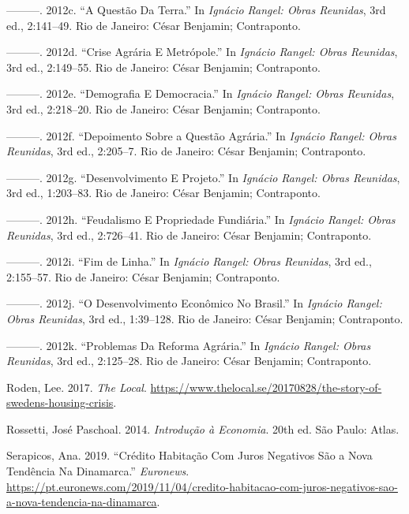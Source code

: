 \documentclass[
	12pt,				%
	oneside,			%
	a4paper,			%
	chapter=TITLE,		%
	section=TITLE,		%
	english,			%
	brazil				%
	]{abntex2}
\begin{document}
\leavevmode\hypertarget{ref-rangel1986c}{}%
---------. 2012c. ``A Questão Da Terra.'' In \emph{Ignácio Rangel: Obras Reunidas}, 3rd ed., 2:141--49. Rio de Janeiro: César Benjamin; Contraponto.

\leavevmode\hypertarget{ref-rangel1986a}{}%
---------. 2012d. ``Crise Agrária E Metrópole.'' In \emph{Ignácio Rangel: Obras Reunidas}, 3rd ed., 2:149--55. Rio de Janeiro: César Benjamin; Contraponto.

\leavevmode\hypertarget{ref-rangel1961}{}%
---------. 2012e. ``Demografia E Democracia.'' In \emph{Ignácio Rangel: Obras Reunidas}, 3rd ed., 2:218--20. Rio de Janeiro: César Benjamin; Contraponto.

\leavevmode\hypertarget{ref-rangel1960}{}%
---------. 2012f. ``Depoimento Sobre a Questão Agrária.'' In \emph{Ignácio Rangel: Obras Reunidas}, 3rd ed., 2:205--7. Rio de Janeiro: César Benjamin; Contraponto.

\leavevmode\hypertarget{ref-rangel1956}{}%
---------. 2012g. ``Desenvolvimento E Projeto.'' In \emph{Ignácio Rangel: Obras Reunidas}, 3rd ed., 1:203--83. Rio de Janeiro: César Benjamin; Contraponto.

\leavevmode\hypertarget{ref-rangel1989}{}%
---------. 2012h. ``Feudalismo E Propriedade Fundiária.'' In \emph{Ignácio Rangel: Obras Reunidas}, 3rd ed., 2:726--41. Rio de Janeiro: César Benjamin; Contraponto.

\leavevmode\hypertarget{ref-rangel1988}{}%
---------. 2012i. ``Fim de Linha.'' In \emph{Ignácio Rangel: Obras Reunidas}, 3rd ed., 2:155--57. Rio de Janeiro: César Benjamin; Contraponto.

\leavevmode\hypertarget{ref-rangel1954}{}%
---------. 2012j. ``O Desenvolvimento Econômico No Brasil.'' In \emph{Ignácio Rangel: Obras Reunidas}, 3rd ed., 1:39--128. Rio de Janeiro: César Benjamin; Contraponto.

\leavevmode\hypertarget{ref-rangel1985}{}%
---------. 2012k. ``Problemas Da Reforma Agrária.'' In \emph{Ignácio Rangel: Obras Reunidas}, 3rd ed., 2:125--28. Rio de Janeiro: César Benjamin; Contraponto.

\leavevmode\hypertarget{ref-suecia}{}%
Roden, Lee. 2017. \emph{The Local}. \url{https://www.thelocal.se/20170828/the-story-of-swedens-housing-crisis}.

\leavevmode\hypertarget{ref-rossetti}{}%
Rossetti, José Paschoal. 2014. \emph{Introdução à Economia}. 20th ed. São Paulo: Atlas.

\leavevmode\hypertarget{ref-serapicos}{}%
Serapicos, Ana. 2019. ``Crédito Habitação Com Juros Negativos São a Nova Tendência Na Dinamarca.'' \emph{Euronews}. \url{https://pt.euronews.com/2019/11/04/credito-habitacao-com-juros-negativos-sao-a-nova-tendencia-na-dinamarca}.
\end{document}
